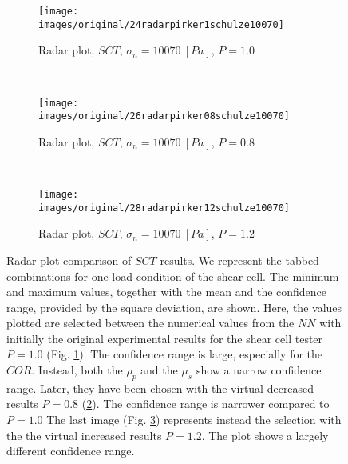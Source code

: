 \begin{figure}[htp] \centering
    \begin{subfigure}[b]{0.5\columnwidth}
        \texttt{[image: images/original/24radarpirker1schulze10070]}
        \caption{Radar plot, $SCT$, $\sigma_n=10070 ~[Pa]$, $P=1.0$}
        \label{fig:24radarpirker1schulze10070}
    \end{subfigure} \\
        \begin{subfigure}[b]{0.5\columnwidth}
        \texttt{[image: images/original/26radarpirker08schulze10070]}
        \caption{Radar plot, $SCT$, $\sigma_n=10070 ~[Pa]$, $P=0.8$}
        \label{fig:26radarpirker08schulze10070} 
    \end{subfigure}\\
        \begin{subfigure}[b]{0.5\columnwidth}
        \texttt{[image: images/original/28radarpirker12schulze10070]}
        \caption{Radar plot, $SCT$, $\sigma_n=10070 ~[Pa]$, $P=1.2$}
        \label{fig:28radarpirker12schulze10070} 
    \end{subfigure}
    \caption[Radar plot comparison of SCT results]{Radar plot comparison of
    $SCT$ results. We represent the tabbed combinations for one load condition
    of the shear cell. The minimum and maximum values, together with the mean and the confidence
	range, provided by the square deviation, are shown.
    Here, the values plotted are selected between the numerical
    values from the $NN$ with initially the original experimental results for the shear cell tester $P=1.0$ (Fig.
    \ref{fig:24radarpirker1schulze10070}). 
    The confidence range is large, especially for the $COR$.
    Instead, both the $\rho_p$  and the $\mu_s$ show a narrow confidence range. 
    Later, they have been chosen with  
    the virtual decreased results $P=0.8$
    (\ref{fig:26radarpirker08schulze10070}).
    The confidence range is narrower compared to $P=1.0$
    The last image (Fig. \ref{fig:28radarpirker12schulze10070}) represents
    instead the selection with the the virtual increased results $P=1.2$.
    The plot shows a largely different confidence range.    }
    \label{fig:29schulzeradarandcloud}
\end{figure}